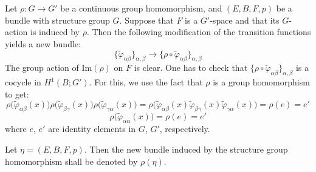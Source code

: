 \documentclass[11pt,a4paper]{article}
\begin{document}
Let $\rho: G\rightarrow G'$ be a continuous group homomorphism, and $(E, B, F, p)$ be a bundle with structure group $G$. Suppose that $F$ is a $G'$-space and that its $G$-action is induced by $\rho$. Then the following modification of the transition functions yields a new bundle:
$$\{\widetilde{\varphi}_{\alpha\beta}\}_{\alpha, \beta} \rightarrow \{\rho\circ\widetilde{\varphi}_{\alpha\beta}\}_{\alpha, \beta}$$
The group action of $\text{Im}(\rho)$ on $F$ is clear. One has to check that $\{\rho\circ\widetilde{\varphi}_{\alpha\beta}\}_{\alpha, \beta}$ is a cocycle in $H^1(B; G')$. For this, we use the fact that $\rho$ is a group homomorphism to get:
$$\rho\big(\widetilde{\varphi}_{\alpha\beta}(x)\big)\rho\big(\widetilde{\varphi}_{\beta\gamma}(x)\big)\rho\big(\widetilde{\varphi}_{\gamma\alpha}(x)\big) = \rho\big(\widetilde{\varphi}_{\alpha\beta}(x)\widetilde{\varphi}_{\beta\gamma}(x)\widetilde{\varphi}_{\gamma\alpha}(x)\big) = \rho(e) = e'$$
$$\rho\big(\widetilde{\varphi}_{\alpha\alpha}(x)\big) = \rho(e) = e'$$
where $e$, $e'$ are identity elements in $G$, $G'$, respectively.


Let $\eta = (E, B, F, p)$. Then the new bundle induced by the structure group homomorphism shall be denoted by $\rho(\eta)$.


\end{document}

